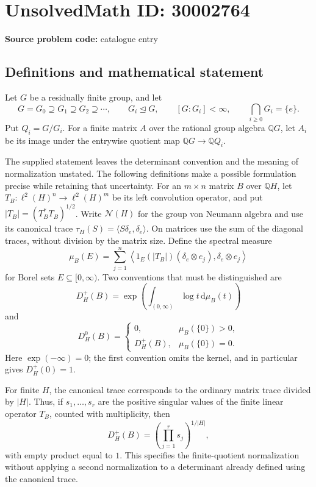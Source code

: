 \documentclass[11pt]{article}
\newcommand{\Q}{\mathbb{Q}}
\begin{document}
\section*{UnsolvedMath ID: 30002764}
\textbf{Source problem code:} catalogue entry
\subsection{Definitions and mathematical statement}
Let \(G\) be a residually finite group, and let
\[
G=G_0\supseteq G_1\supseteq G_2\supseteq\cdots,
\qquad G_i\trianglelefteq G,
\qquad [G:G_i]<\infty,
\qquad \bigcap_{i\geq 0}G_i=\{e\}.
\]
Put \(Q_i=G/G_i\). For a finite matrix \(A\) over the rational group algebra \(\Q G\), let \(A_i\) be its image under the entrywise quotient map \(\Q G\to\Q Q_i\).

The supplied statement leaves the determinant convention and the meaning of normalization unstated. The following definitions make a possible formulation precise while retaining that uncertainty. For an \(m\times n\) matrix \(B\) over \(\Q H\), let \(T_B:\ell^2(H)^n\to\ell^2(H)^m\) be its left convolution operator, and put \(|T_B|=(T_B^*T_B)^{1/2}\). Write \(\mathcal N(H)\) for the group von Neumann algebra and use its canonical trace \(\tau_H(S)=\langle S\delta_e,\delta_e\rangle\). On matrices use the sum of the diagonal traces, without division by the matrix size. Define the spectral measure
\[
\mu_B(E)=\sum_{j=1}^n\left\langle 1_E(|T_B|)(\delta_e\otimes e_j),\delta_e\otimes e_j\right\rangle
\]
for Borel sets \(E\subseteq[0,\infty)\). Two conventions that must be distinguished are
\[
D_H^+(B)=\exp\left(\int_{(0,\infty)}\log t\,\mathrm d\mu_B(t)\right)
\]
and
\[
D_H^0(B)=
\begin{cases}
0,&\mu_B(\{0\})>0,\\
D_H^+(B),&\mu_B(\{0\})=0.
\end{cases}
\]
Here \(\exp(-\infty)=0\); the first convention omits the kernel, and in particular gives \(D_H^+(0)=1\).

For finite \(H\), the canonical trace corresponds to the ordinary matrix trace divided by \(|H|\). Thus, if \(s_1,\ldots,s_r\) are the positive singular values of the finite linear operator \(T_B\), counted with multiplicity, then
\[
D_H^+(B)=\left(\prod_{j=1}^r s_j\right)^{1/|H|},
\]
with empty product equal to \(1\). This specifies the finite-quotient normalization without applying a second normalization to a determinant already defined using the canonical trace.
\end{document}
